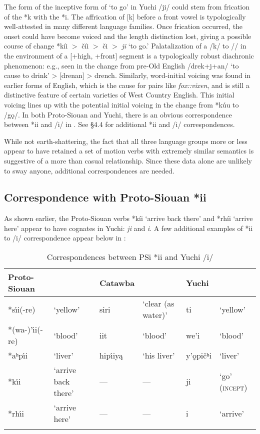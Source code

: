 \documentclass[output=paper]{LSP/langsci}
\begin{document}
The form of the inceptive form of `to go' in Yuchi /ji/ could stem from frication of the *k with the *i. The affrication of [k] before a front vowel is typologically well-attested in many different language families. Once frication occurred, the onset could have become voiced and the length distinction lost, giving a possible course of change *k\'ii $>$ {\v{c}}\'ii $>$ {\v{c}}i $>$ \emph{ji} `to go.' Palatalization of a /k/ to // in the environment of a [+high, +front] segment is a typologically robust diachronic phenomenon: e.g., seen in the change from pre-Old English /drek+j+an/ `to cause to drink' > [drenan] > drench. Similarly, word-initial voicing was found in earlier forms of English, which is the cause for pairs like \textit{fox::vixen}, and is still a distinctive feature of certain varieties of West Country English. This initial voicing lines up with the potential initial voicing in the change from *k\'uu to /g\k{o}/. In both Proto-Siouan and Yuchi, there is an obvious correspondence between *ii and /i/ in . See \S4.4 for additional *ii and /i/ correspondences.

While not earth-shattering, the fact that all three language groups more or less appear to have retained a set of motion verbs with extremely similar semantics is suggestive of a more than casual relationship. Since these data alone are unlikely to sway anyone, additional correspondences are needed.

\subsection{Correspondence with Proto-Siouan *ii}

As shown earlier, the Proto-Siouan verbs *k\'ii `arrive back there' and *rh\'ii `arrive here' appear to have cognates in Yuchi: \emph{ji} and \emph{\textbeltl i}. A few additional examples of *ii to /i/ correspondence appear below in :

\begin{table}[h]
\footnotesize
\centering
\caption{Correspondences between PSi *ii and Yuchi /i/}\label{*ii}
	\begin{tabular}{llllll}\lsptoprule
	Proto-Siouan 			&	~	&	Catawba	&	~			&	Yuchi		&	~	\\
\midrule
	*s\'\i i(-re)				&	`yellow'	&	siri		&	`clear (as water)'	&	ti			&	`yellow'\\
	*(wa-)'\'\i i(-re)	&	`blood'		&	iit		&	`blood'					&	we'i		&	`blood'\\ 
	*aʰp\'\i i				&	`liver'		&	hip\'\i iy\k{a}		&	`his liver'					&	y'\k{o}pi\v{c}{ʰ}i		&	`liver'\\ 
	*k\'\i i & `arrive back there' & --- & --- & ji & `go' (\textsc{incept})\\
	*rh\'\i i & `arrive here' & --- & --- & \textbeltl i    & `arrive'  \\
\lspbottomrule	\end{tabular}
\end{table}
\end{document}
